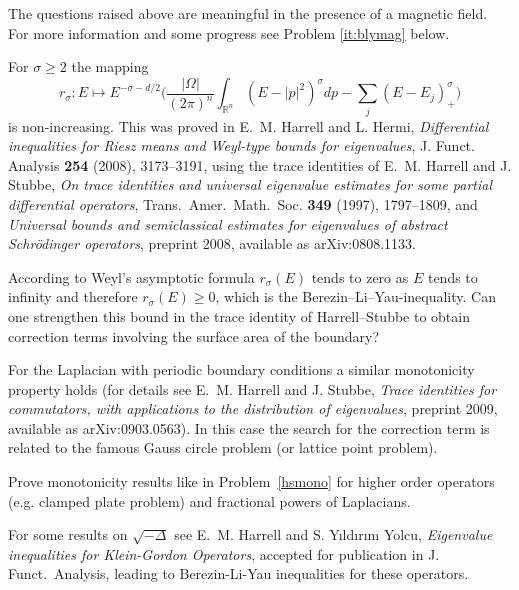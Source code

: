 \documentclass[12pt,letterpaper, reqno]{aimpl}
\begin{document}
\begin{prob}[1.4] 
 The questions raised above are meaningful in the presence of a magnetic field. For more information and some progress see Problem \ref{it:blymag} below.
\end{prob}


\begin{problemblock}
For $\sigma\geq 2$ the mapping
\begin{equation*}
   r_{\sigma}: E\mapsto E^{-\sigma-d/2}\bigg(\frac{|\Omega|}{(2\pi)^n}\int_{\mathbb{R}^n}(E-|p|^2)^{\sigma}dp -\sum_j(E-E_j)_{+}^{\sigma}\bigg)
\end{equation*}
is non-increasing. This was proved in E.~M. Harrell and L. Hermi, \textit{Differential inequalities for
Riesz means and Weyl-type bounds for eigenvalues}, {J. Funct.
Analysis} \textbf{254} (2008), 3173--3191, using the trace identities of E.~M. Harrell and J. Stubbe, \textit{On trace identities and universal eigenvalue estimates for some partial differential
operators}, {Trans.\ Amer.\ Math.\ Soc.} \textbf{349} (1997),
1797--1809, and \textit{Universal bounds and
semiclassical estimates for eigenvalues of abstract Schr\"odinger
operators}, preprint 2008, available as arXiv:0808.1133.

\begin{problem}[1.5]\label{hsmono}
According to Weyl's asymptotic formula
$r_{\sigma}(E)$ tends to zero as $E$ tends to infinity and
therefore $r_{\sigma}(E)\geq 0$, which is the
Berezin--Li--Yau-inequality. Can one strengthen this bound in the
trace identity of Harrell--Stubbe to obtain correction
terms involving the surface area of the boundary?
\end{problem}

 For the
Laplacian with periodic boundary conditions a similar monotonicity
property holds (for details see E.~M. Harrell and J. Stubbe, \textit{Trace identities for
commutators, with applications to the distribution of
eigenvalues}, preprint 2009, available as arXiv:0903.0563). In this case the
search for the correction term is related to the famous Gauss
circle problem (or lattice point problem).
\end{problemblock}


\begin{problemblock}

\begin{problem}[1.55]
Prove monotonicity results like in Problem~\ref{hsmono} for higher
order operators (e.g. clamped plate problem) and fractional powers
of Laplacians.
\end{problem}

For some results on $\sqrt{-\Delta}$ see E.~M.
Harrell and S. Y{\i}ld{\i}r{\i}m Yolcu, \emph{Eigenvalue
inequalities for Klein-Gordon Operators}, accepted for publication
in J. Funct.\ Analysis, leading to Berezin-Li-Yau inequalities for
these operators.

\end{problemblock}
\end{document}
